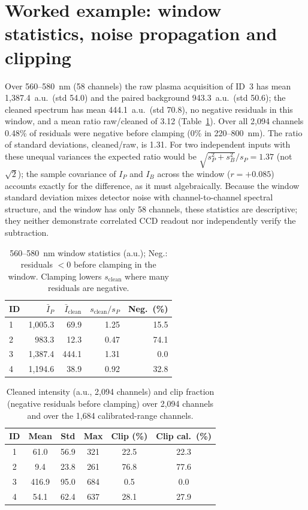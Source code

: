 \documentclass[10pt,a4paper]{article}
\begin{document}
\section{Worked example: window statistics, noise propagation and clipping}

Over 560--580~nm (58 channels) the raw plasma acquisition of ID~3 has mean 1,387.4~a.u.\ (std 54.0) and the paired background 943.3~a.u.\ (std 50.6); the cleaned spectrum has mean 444.1~a.u.\ (std 70.8), no negative residuals in this window, and a mean ratio raw/cleaned of 3.12 (Table~\ref{table:window}). Over all 2,094 channels 0.48\% of residuals were negative before clamping (0\% in 220--800~nm). The ratio of standard deviations, cleaned/raw, is 1.31. For two independent inputs with these unequal variances the expected ratio would be $\sqrt{s_P^2+s_B^2}/s_P = 1.37$ (not $\sqrt2$); the sample covariance of $I_P$ and $I_B$ across the window ($r=+0.085$) accounts exactly for the difference, as it must algebraically. Because the window standard deviation mixes detector noise with channel-to-channel spectral structure, and the window has only 58 channels, these statistics are descriptive; they neither demonstrate correlated CCD readout nor independently verify the subtraction.

\begin{table}[htbp]
\centering
\footnotesize
\setlength{\tabcolsep}{3pt}
\begin{tabular}{@{}lrrrr@{}}
\toprule
\textbf{ID} & \textbf{$\bar I_P$} & \textbf{$\bar I_{\mathrm{clean}}$} & \textbf{$s_{\mathrm{clean}}/s_P$} & \textbf{Neg.\ (\%)} \\
\midrule
1 & 1,005.3 & 69.9  & 1.25 & 15.5 \\
2 & 983.3   & 12.3  & 0.47 & 74.1 \\
3 & 1,387.4 & 444.1 & 1.31 & 0.0 \\
4 & 1,194.6 & 38.9  & 0.92 & 32.8 \\
\bottomrule
\end{tabular}
\caption{560--580~nm window statistics (a.u.); Neg.: residuals $<0$ before clamping in the window. Clamping lowers $s_{\mathrm{clean}}$ where many residuals are negative.}
\label{table:window}
\end{table}

\begin{table}[htbp]
\centering
\footnotesize
\setlength{\tabcolsep}{4pt}
\begin{tabular}{@{}cccccc@{}}
\toprule
\textbf{ID} & \textbf{Mean} & \textbf{Std} & \textbf{Max} & \textbf{Clip (\%)} & \textbf{Clip cal.\ (\%)} \\
\midrule
1 & 61.0  & 56.9 & 321 & 22.5 & 22.3 \\
2 & 9.4   & 23.8 & 261 & 76.8 & 77.6 \\
3 & 416.9 & 95.0 & 684 & 0.5  & 0.0 \\
4 & 54.1  & 62.4 & 637 & 28.1 & 27.9 \\
\bottomrule
\end{tabular}
\caption{Cleaned intensity (a.u., 2,094 channels) and clip fraction (negative residuals before clamping) over 2,094 channels and over the 1,684 calibrated-range channels.}
\label{table:variability}
\end{table}
\end{document}
